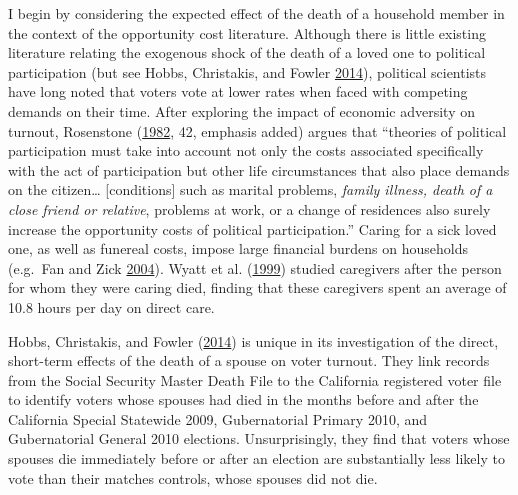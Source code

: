 \documentclass[
  12pt,
]{article}
\begin{document}
I begin by considering the expected effect of the death of a household member in the context of the opportunity cost literature. Although there is little existing literature relating the exogenous shock of the death of a loved one to political participation (but see Hobbs, Christakis, and Fowler \protect\hyperlink{ref-Hobbs2014}{2014}), political scientists have long noted that voters vote at lower rates when faced with competing demands on their time. After exploring the impact of economic adversity on turnout, Rosenstone (\protect\hyperlink{ref-Rosenstone1982}{1982}, 42, emphasis added) argues that ``theories of political participation must take into account not only the costs associated specifically with the act of participation but other life circumstances that also place demands on the citizen\ldots{} {[}conditions{]} such as marital problems, \emph{family illness, death of a close friend or relative}, problems at work, or a change of residences also surely increase the opportunity costs of political participation.'' Caring for a sick loved one, as well as funereal costs, impose large financial burdens on households (e.g.~Fan and Zick \protect\hyperlink{ref-Fan2004}{2004}). Wyatt et al. (\protect\hyperlink{ref-Wyatt1999}{1999}) studied caregivers after the person for whom they were caring died, finding that these caregivers spent an average of 10.8 hours per day on direct care.

Hobbs, Christakis, and Fowler (\protect\hyperlink{ref-Hobbs2014}{2014}) is unique in its investigation of the direct, short-term effects of the death of a spouse on voter turnout. They link records from the Social Security Master Death File to the California registered voter file to identify voters whose spouses had died in the months before and after the California Special Statewide 2009, Gubernatorial Primary 2010, and Gubernatorial General 2010 elections. Unsurprisingly, they find that voters whose spouses die immediately before or after an election are substantially less likely to vote than their matches controls, whose spouses did not die.
\end{document}

